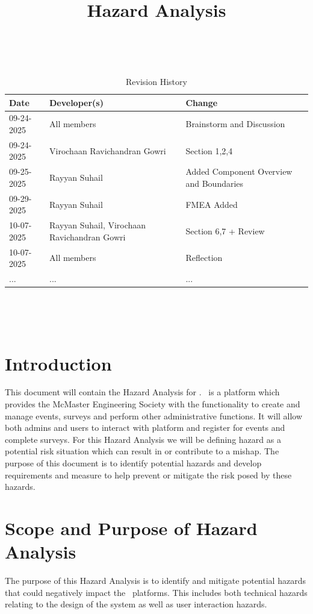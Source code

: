 \documentclass[12pt]{article}
\title{Hazard Analysis\\\progname}
\author{\authname}
\date{}
\begin{document}
\maketitle
\thispagestyle{empty}

~\newpage


\begin{table}[hp]
\caption{Revision History} \label{TblRevisionHistory}
\begin{tabularx}{\textwidth}{llX}
\toprule
\textbf{Date} & \textbf{Developer(s)} & \textbf{Change}\\
\midrule
09-24-2025 & All members & Brainstorm and Discussion\\
09-24-2025 & Virochaan Ravichandran Gowri & Section 1,2,4\\
09-25-2025 & Rayyan Suhail & Added Component Overview and Boundaries\\
09-29-2025 & Rayyan Suhail & FMEA Added\\
10-07-2025 & Rayyan Suhail, Virochaan Ravichandran Gowri  & Section 6,7 + Review\\
10-07-2025 & All members & Reflection\\
... & ... & ...\\
\bottomrule
\end{tabularx}
\end{table}

~\newpage

\tableofcontents

~\newpage

\section{Introduction}
This document will contain the Hazard Analysis for \teamname. \teamname \ is a platform which provides the McMaster Engineering Society with the functionality to create and manage events, surveys and perform other administrative functions. It will allow both admins and users to interact with platform and register for events and complete surveys. For this Hazard Analysis we will be defining hazard as a potential risk situation which can result in or contribute to a mishap. The purpose of this document is to identify potential hazards and develop requirements and measure to help prevent or mitigate the risk posed by these hazards.

\section{Scope and Purpose of Hazard Analysis}
The purpose of this Hazard Analysis is to identify and mitigate potential hazards that could negatively impact the \teamname \ platforms. This includes both technical hazards relating to the design of the system as well as user interaction hazards.
\end{document}
